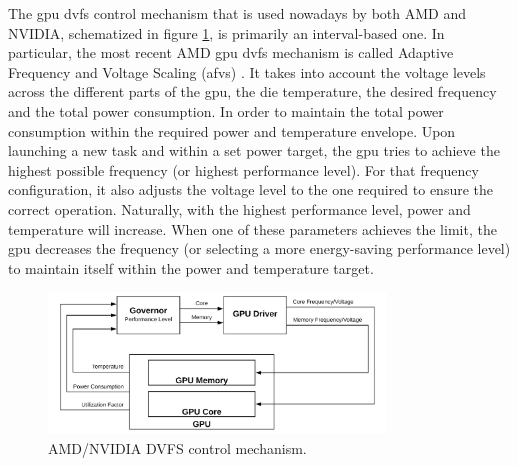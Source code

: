 The \acrshort{gpu} \acrshort{dvfs} control mechanism that is used nowadays by both AMD and NVIDIA, schematized in figure \ref{fig:DVFSmechanism}, is primarily an interval-based one. In particular, the most recent AMD \acrshort{gpu} \acrshort{dvfs} mechanism is called Adaptive Frequency and Voltage Scaling (\acrshort{afvs}) \cite{amd_polaris_2017}. It takes into account the voltage levels across the different parts of the \acrshort{gpu}, the die temperature, the desired frequency and the total power consumption. In order to maintain the total power consumption within the required power and temperature envelope. Upon launching a new task and within a set power target, the \acrshort{gpu} tries to achieve the highest possible frequency (or highest performance level). For that frequency configuration, it also adjusts the voltage level to the one required to ensure the correct operation. Naturally, with the highest performance level, power and temperature will increase. When one of these parameters achieves the limit, the \acrshort{gpu} decreases the frequency (or selecting a more energy-saving performance level) to maintain itself within the power and temperature target. 

\begin{figure}[htb]
  \centering
  \includegraphics[width=0.8\textwidth]{Figures/Background/DVFS.png}
  \caption{AMD/NVIDIA DVFS control mechanism.}
  \label{fig:DVFSmechanism}
\end{figure}

